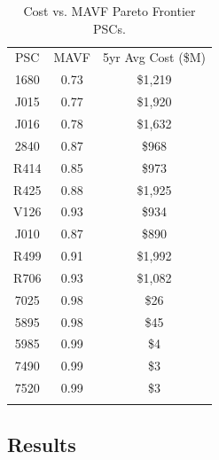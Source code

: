 \documentclass[twocolumn]{svjour3}       %
\begin{document}
\begin{table}[!htb]
  \caption{Cost vs. MAVF Pareto Frontier PSCs.}
  \label{tab:3}       %
  \begin{tabular}{ccc}
    \hline\noalign{\smallskip}
    PSC &	MAVF & 5yr Avg Cost (\$M) \\
    \noalign{\smallskip}\hline\noalign{\smallskip}
    1680 &	0.73 &	\$1,219 \\
    J015 &	0.77 &	\$1,920 \\
    J016 &	0.78 &	\$1,632 \\
    2840 &	0.87 &	\$968 \\
    R414 &	0.85 &	\$973 \\
    R425 &	0.88 &	\$1,925 \\
    V126 &	0.93 &	\$934 \\
    J010 &	0.87 &	\$890 \\
    R499 &	0.91 &	\$1,992 \\
    R706 &	0.93 &	\$1,082 \\
    7025 &	0.98 &	\$26 \\
    5895 &	0.98 &	\$45 \\
    5985 &	0.99 &	\$4 \\
    7490 &	0.99 &	\$3 \\
    7520 &	0.99 &	\$3 \\
    \noalign{\smallskip}\hline
  \end{tabular}
\end{table}


\subsection{Results}
\label{sec:5.3}
\end{document}
